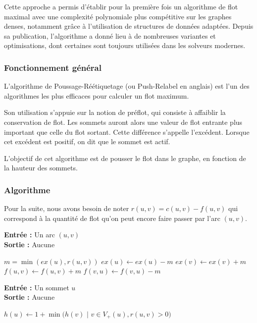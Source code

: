 \documentclass[a4paper]{article}
\begin{document}
Cette approche a permis d’établir pour la première fois un algorithme de flot maximal avec une complexité polynomiale plus compétitive sur les graphes denses, notamment grâce à l’utilisation de structures de données adaptées. Depuis sa publication, l’algorithme a donné lieu à de nombreuses variantes et optimisations, dont certaines sont toujours utilisées dans les solveurs modernes.


\subsubsection{Fonctionnement général}
L'algorithme de Poussage-Réétiquetage (ou Push-Relabel en anglais) est l'un des algorithmes les plus efficaces pour calculer un flot maximum. 

Son utilisation s'appuie sur la notion de préflot, qui consiste à affaiblir la conservation de flot. Les sommets auront alors une valeur de flot entrante plus important que celle du flot sortant. Cette différence s'appelle l'excédent. Lorsque cet excédent est positif, on dit que le sommet est actif.

L'objectif de cet algorithme est de pousser le flot dans le graphe, en fonction de la hauteur des sommets.

\subsubsection{Algorithme}

Pour la suite, nous avons besoin de noter $r(u,v)=c(u,v)-f(u,v)$ qui correspond à la quantité de flot qu'on peut encore faire passer par l'arc $(u,v)$.\\
\begin{algorithm}[H]
	\caption{Algorithme de Poussage}
	\textbf{Entrée :} Un arc $(u,v)$ \\
	\textbf{Sortie :} Aucune
	\begin{algorithmic}[1]
		\State $m = \min(ex(u), r(u,v))$
		\State $ex(u) \gets ex(u) - m$
		\State $ex(v) \gets ex(v) + m$
		\State $f(u,v) \gets f(u,v) + m$
		\State $f(v,u) \gets f(v,u) - m$
	\end{algorithmic}
\end{algorithm}

\begin{algorithm}[H]
	\caption{Algorithme de Réétiquetage}
	\textbf{Entrée :} Un sommet $u$ \\
	\textbf{Sortie :} Aucune
	\begin{algorithmic}[1]
		\State $h(u) \gets 1 + \min(h(v)$ $|$ $v \in V_+(u), r(u,v)>0 )$
	\end{algorithmic}
\end{algorithm}
\end{document}
